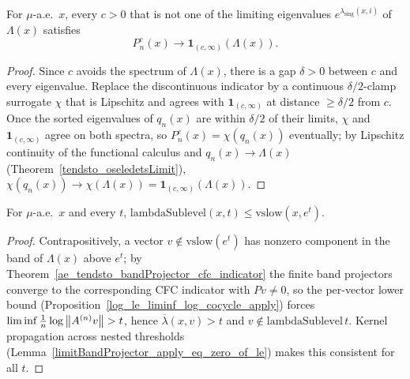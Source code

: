 \begin{theorem}\label{ae_tendsto_bandProjector_cfc_indicator}
  \leanok
  For \(\mu\)-a.e.\ \(x\), every \(c>0\) that is not one of the limiting eigenvalues
  \(e^{\lambda_{\mathrm{sing}}(x,i)}\) of \(\Lambda(x)\) satisfies
  \[
    P^{c}_n(x) \longrightarrow \mathbf 1_{(c,\infty)}(\Lambda(x)).
  \]
\end{theorem}
\begin{proof}\leanok
  Since \(c\) avoids the spectrum of \(\Lambda(x)\), there is a gap \(\delta>0\) between \(c\) and
  every eigenvalue. Replace the discontinuous indicator by a continuous \(\delta/2\)-clamp
  surrogate \(\chi\) that is Lipschitz and agrees with \(\mathbf 1_{(c,\infty)}\) at distance
  \(\ge\delta/2\) from \(c\). Once the sorted eigenvalues of \(q_n(x)\) are within \(\delta/2\) of
  their limits, \(\chi\) and \(\mathbf 1_{(c,\infty)}\) agree on both spectra, so
  \(P^{c}_n(x)=\chi(q_n(x))\) eventually; by Lipschitz continuity of the functional calculus and
  \(q_n(x)\to\Lambda(x)\) (Theorem~\ref{tendsto_oseledetsLimit}),
  \(\chi(q_n(x))\to\chi(\Lambda(x))=\mathbf 1_{(c,\infty)}(\Lambda(x))\).
\end{proof}

\begin{theorem}\label{ae_lambdaSublevel_le_vslow}
  \leanok
  For \(\mu\)-a.e.\ \(x\) and every \(t\),
  \(\mathrm{lambdaSublevel}(x,t) \le \mathrm{vslow}(x,e^t)\).
\end{theorem}
\begin{proof}\leanok
  Contrapositively, a vector \(v\notin\mathrm{vslow}(e^t)\) has nonzero component in the band of
  \(\Lambda(x)\) above \(e^t\); by Theorem~\ref{ae_tendsto_bandProjector_cfc_indicator} the finite
  band projectors converge to the corresponding CFC indicator with \(Pv\neq0\), so the per-vector
  lower bound (Proposition~\ref{log_le_liminf_log_cocycle_apply}) forces
  \(\liminf\tfrac1n\log\left\lVert A^{(n)}v \right\rVert > t\), hence \(\overline\lambda(x,v)>t\) and
  \(v\notin\mathrm{lambdaSublevel}\,t\). Kernel propagation across nested thresholds
  (Lemma~\ref{limitBandProjector_apply_eq_zero_of_le}) makes this consistent for all \(t\).
\end{proof}

